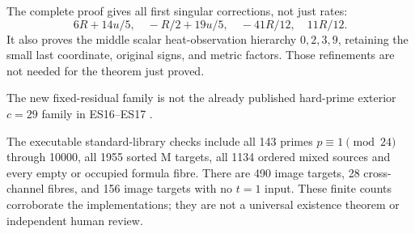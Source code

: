 \documentclass[10pt,reqno]{amsart}
\begin{document}
The complete proof gives all first singular corrections, not just rates:
\[
6R+14u/5,\quad -R/2+19u/5,\quad-41R/12,\quad11R/12.
\]
It also proves the middle scalar heat-observation hierarchy $0,2,3,9$,
retaining the small last coordinate, original signs, and metric factors.
Those refinements are not needed for the theorem just proved.

The new fixed-residual family is not the already published hard-prime
exterior $c=29$ family in ES16--ES17 \citep{EScont}.

The executable standard-library checks include all 143 primes
$p\equiv1\pmod{24}$ through 10000, all 1955 sorted M targets, all 1134
ordered mixed sources and every empty or occupied formula fibre.
There are 490 image targets, 28 cross-channel fibres, and 156 image targets
with no $t=1$ input. These finite counts corroborate the implementations;
they are not a universal existence theorem or independent human review.

\end{document}
